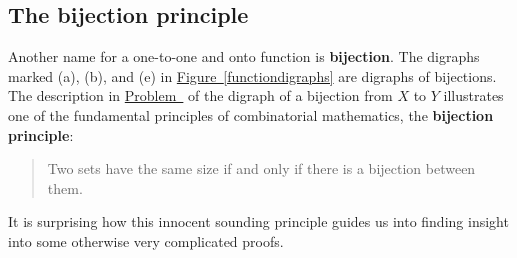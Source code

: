 \documentclass[10pt,]{book}
\newcommand{\terminology}[1]{\textbf{#1}}
\theoremstyle{plain}
\theoremstyle{definition}
\numberwithin{equation}{chapter}
\begin{document}
\subsection[{The bijection principle}]{The bijection principle}\label{subsection-3}
Another name for a one-to-one and onto function is \terminology{bijection}. The digraphs marked (a), (b), and (e) in \hyperref[functiondigraphs]{Figure~\ref{functiondigraphs}} are digraphs of bijections. The description in \hyperref[bijectiondigraph]{Problem~} of the digraph of a bijection from \(X\) to \(Y\) illustrates one of the fundamental principles of combinatorial mathematics, the \terminology{bijection principle}:%
\begin{quote}Two sets have the same size if and only if there is a bijection between them.%
\end{quote}
It is surprising how this innocent sounding principle guides us into finding insight into some otherwise very complicated proofs.%
\typeout{************************************************}
\typeout{************************************************}
\end{document}
